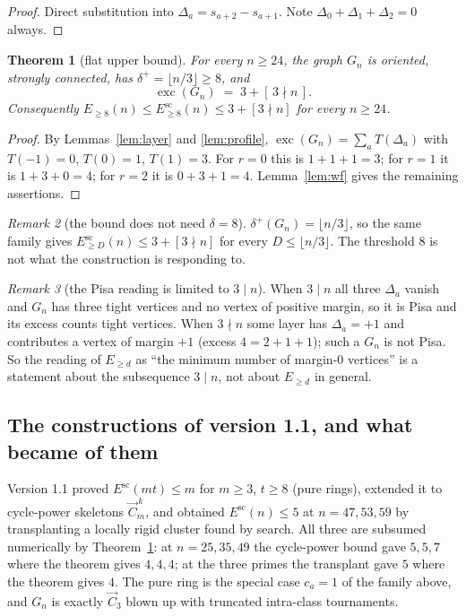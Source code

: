\documentclass[11pt]{amsart}
\newtheorem{theorem}{Theorem}[section]
\theoremstyle{remark}
\newtheorem{remark}[theorem]{Remark}
\newcommand{\exc}{\operatorname{exc}}
\newcommand{\Esc}{E^{\mathrm{sc}}}
\begin{document}
\begin{proof}
Direct substitution into $\Delta_a = s_{a+2} - s_{a+1}$. Note
$\Delta_0 + \Delta_1 + \Delta_2 = 0$ always.
\end{proof}

\begin{theorem}[flat upper bound]\label{thm:flat}
For every $n \ge 24$, the graph $G_n$ is oriented, strongly connected, has
$\delta^+ = \lfloor n/3 \rfloor \ge 8$, and
\[
\exc(G_n) \;=\; 3 + [\,3 \nmid n\,].
\]
Consequently $E_{\ge 8}(n) \le \Esc_{\ge 8}(n)
\le 3 + [3 \nmid n]$ for every $n \ge 24$.
\end{theorem}

\begin{proof}
By Lemmas~\ref{lem:layer} and \ref{lem:profile},
$\exc(G_n) = \sum_a T(\Delta_a)$ with $T(-1) = 0$, $T(0) = 1$, $T(1) = 3$.
For $r = 0$ this is $1+1+1 = 3$; for $r = 1$ it is $1+3+0 = 4$; for $r = 2$ it
is $0+3+1 = 4$. Lemma~\ref{lem:wf} gives the remaining assertions.
\end{proof}

\begin{remark}[the bound does not need $\delta = 8$]\label{rem:delta}
$\delta^+(G_n) = \lfloor n/3 \rfloor$, so the same family gives
$\Esc_{\ge D}(n) \le 3 + [3 \nmid n]$ for every $D \le \lfloor n/3
\rfloor$. The threshold $8$ is not what the construction is responding to.
\end{remark}

\begin{remark}[the Pisa reading is limited to $3 \mid n$]\label{rem:pisa}
When $3 \mid n$ all three $\Delta_a$ vanish and $G_n$ has three tight vertices
and no vertex of positive margin, so it is Pisa and its excess counts tight
vertices. When $3 \nmid n$ some layer has $\Delta_a = +1$ and contributes a
vertex of margin $+1$ (excess $4 = 2 + 1 + 1$); such a $G_n$ is not Pisa.
So the reading of $E_{\ge d}$ as ``the minimum number of margin-$0$ vertices''
is a statement about the subsequence $3 \mid n$, not about $E_{\ge d}$ in
general.
\end{remark}

\subsection{The constructions of version 1.1, and what became of them}
\label{sec:legacy}

Version 1.1 proved $\Esc(mt) \le m$ for $m \ge 3$, $t \ge 8$ (pure rings),
extended it to cycle-power skeletons $\vec{C}_m^{\,k}$, and obtained
$\Esc(n) \le 5$ at $n = 47, 53, 59$ by transplanting a locally rigid cluster
found by search. All three are subsumed numerically by
Theorem~\ref{thm:flat}: at $n = 25, 35, 49$ the cycle-power bound gave $5, 5,
7$ where the theorem gives $4, 4, 4$; at the three primes the transplant gave
$5$ where the theorem gives $4$. The pure ring is the special case $c_a = 1$
of the family above, and $G_n$ is exactly $\vec{C}_3$ blown up with truncated
intra-class tournaments.
\end{document}
